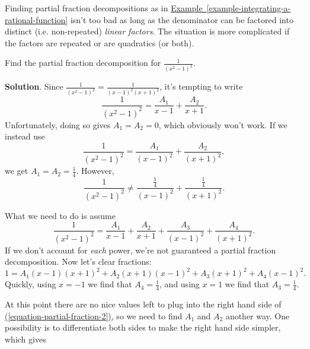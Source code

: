 \documentclass[10pt,]{book}
\theoremstyle{ptxplainnotitle}
\theoremstyle{ptxplaintitle}
\theoremstyle{ptxplainnotitle}
\theoremstyle{ptxplaintitle}
\theoremstyle{ptxplainnotitle}
\theoremstyle{ptxplaintitle}
\theoremstyle{ptxdefinitionnotitle}
\theoremstyle{ptxdefinitiontitle}
\theoremstyle{ptxdefinitionnotitle}
\theoremstyle{ptxdefinitiontitle}
\theoremstyle{ptxdefinitionnotitle}
\theoremstyle{ptxdefinitiontitle}
\theoremstyle{ptxdefinitionnotitle}
\theoremstyle{ptxdefinitiontitle}
\theoremstyle{ptxdefinitionnotitle}
\theoremstyle{ptxdefinitiontitle}
\numberwithin{equation}{section}
\begin{document}
\hypertarget{p-554}{}%
Finding partial fraction decompositions as in \hyperref[example-integrating-a-rational-function]{Example~\ref{example-integrating-a-rational-function}} isn't too bad as long as the denominator can be factored into distinct (i.e. non-repeated) \emph{linear factors}. The situation is more complicated if the factors are repeated or are quadratics (or both).%
\begin{example}\label{example-finding-a-partial-fraction-decomposition-with-repeated-powers}
\hypertarget{p-555}{}%
Find the partial fraction decomposition for \(\frac{1}{(x^{2} - 1)^{2}}\).%
\par\smallskip%
\noindent\textbf{Solution}.\hypertarget{solution-122}{}\quad%
\hypertarget{p-556}{}%
Since \(\frac{1}{(x^{2} - 1)^{2}} = \frac{1}{(x-1)^{2}(x+1)^{2}}\), it's tempting to write%
\begin{equation*}
\frac{1}{(x^{2}-1)^{2}} = \frac{A_{1}}{x-1} + \frac{A_{2}}{x+1}.
\end{equation*}
Unfortunately, doing so gives \(A_{1} = A_{2} = 0\), which obviously won't work. If we instead use%
\begin{equation*}
\frac{1}{(x^{2}-1)^{2}} = \frac{A_{1}}{(x-1)^{2}} + \frac{A_{2}}{(x+1)^{2}},
\end{equation*}
we get \(A_{1} = A_{2} = \frac{1}{4}\). However,%
\begin{equation*}
\frac{1}{(x^{2}-1)^{2}} \neq \frac{\frac{1}{4}}{(x-1)^{2}} + \frac{\frac{1}{4}}{(x+1)^{2}}.
\end{equation*}
%
\par
\hypertarget{p-557}{}%
What we need to do is assume%
\begin{equation*}
\frac{1}{(x^{2}-1)^{2}} = \frac{A_{1}}{x-1} + \frac{A_{2}}{x+1} + \frac{A_{3}}{(x-1)^{2}} + \frac{A_{4}}{(x+1)^{2}}.
\end{equation*}
If we don't account for \emph{each} power, we're not guaranteed a partial fraction decomposition. Now let's clear fractions:%
\begin{equation}
1 = A_{1}(x-1)(x+1)^{2} + A_{2}(x+1)(x-1)^{2} + A_{3}(x+1)^{2} + A_{4}(x-1)^{2}.\label{equation-partial-fraction-2}
\end{equation}
Quickly, using \(x=-1\) we find that \(A_{4} = \frac{1}{4}\), and using \(x = 1\) we find that \(A_{3} = \frac{1}{4}\).%
\par
\hypertarget{p-558}{}%
At this point there are no nice values left to plug into the right hand side of \hyperref[equation-partial-fraction-2]{(\ref{equation-partial-fraction-2})}, so we need to find \(A_{1}\) and \(A_{2}\) another way. One possibility is to differentiate both sides to make the right hand side simpler, which gives%

\end{example}
\end{document}
